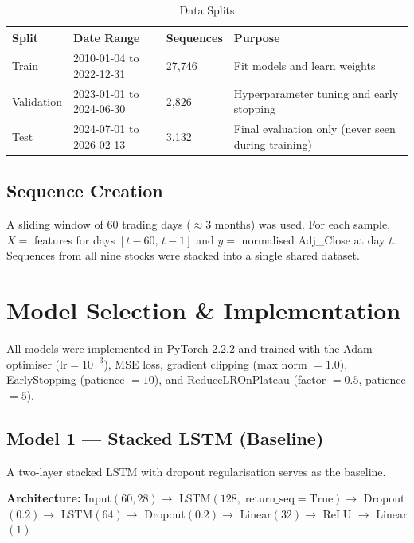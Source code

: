 \documentclass[12pt, a4paper]{article}
\begin{document}
\vspace{4pt}
\begin{table}[H]
\caption{Data Splits}
\label{tab:splits}
\begin{tabularx}{\textwidth}{L{2.2cm} L{4.2cm} C{2.4cm} X}
\color{white}\textbf{Split} & \color{white}\textbf{Date Range} & \color{white}\textbf{Sequences} & \color{white}\textbf{Purpose} \\
\midrule
Train      & 2010-01-04 to 2022-12-31 & 27,746 & Fit models and learn weights \\
Validation & 2023-01-01 to 2024-06-30 &  2,826 & Hyperparameter tuning and early stopping \\
Test       & 2024-07-01 to 2026-02-13 &  3,132 & Final evaluation only (never seen during training) \\
\bottomrule
\end{tabularx}
\end{table}

\subsection{Sequence Creation}

A sliding window of 60 trading days ($\approx$3 months) was used. For each sample, $X =$ features for days $[t-60,\, t-1]$ and $y =$ normalised Adj\_Close at day $t$. Sequences from all nine stocks were stacked into a single shared dataset.

\section{Model Selection \& Implementation}

All models were implemented in PyTorch 2.2.2 and trained with the Adam optimiser ($\text{lr}=10^{-3}$), MSE loss, gradient clipping (max norm $= 1.0$), EarlyStopping (patience $= 10$), and ReduceLROnPlateau (factor $= 0.5$, patience $= 5$).

\subsection{Model 1 --- Stacked LSTM (Baseline)}

A two-layer stacked LSTM with dropout regularisation serves as the baseline.

\textbf{Architecture:} Input$(60, 28) \to$ LSTM$(128,\;\text{return\_seq}=\text{True}) \to$ Dropout$(0.2) \to$ LSTM$(64) \to$ Dropout$(0.2) \to$ Linear$(32) \to$ ReLU $\to$ Linear$(1)$
\end{document}
